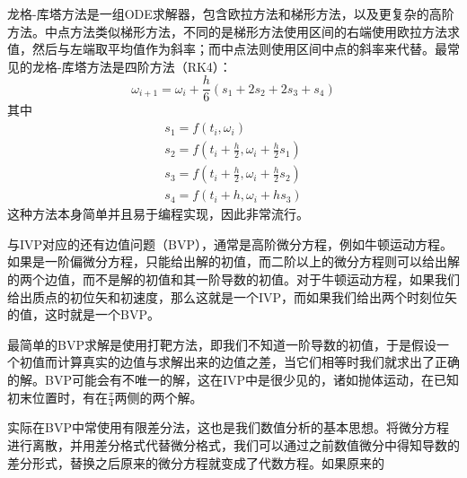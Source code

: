 \documentclass[UTF8,a4paper,10pt]{ctexart}
\begin{document}
\begin{multicols}{2}
            龙格-库塔方法是一组ODE求解器，包含欧拉方法和梯形方法，以及更复杂的高阶方法。中点方法类似梯形方法，不同的是梯形方法使用区间的右端使用欧拉方法求值，然后与左端取平均值作为斜率；而中点法则使用区间中点的斜率来代替。最常见的龙格-库塔方法是四阶方法（RK4）：
            \begin{equation}
                    \omega_{i+1} = \omega_i + \frac{h}{6}(s_1+2s_2+2s_3+s_4)
            \end{equation}
            其中
            \begin{equation*}
                \begin{array}{l}
                    s_1 = f(t_i,\omega_i)\\
                    s_2 = f(t_i+\frac{h}{2},\omega_i+\frac{h}{2}s_1)\\
                    s_3 = f(t_i+\frac{h}{2},\omega_i+\frac{h}{2}s_2)\\
                    s_4 = f(t_i+h,\omega_i+hs_3)
                \end{array}
            \end{equation*}
            这种方法本身简单并且易于编程实现，因此非常流行。\par
            与IVP对应的还有边值问题（BVP），通常是高阶微分方程，例如牛顿运动方程。如果是一阶偏微分方程，只能给出解的初值，而二阶以上的微分方程则可以给出解的两个边值，而不是解的初值和其一阶导数的初值。对于牛顿运动方程，如果我们给出质点的初位矢和初速度，那么这就是一个IVP，而如果我们给出两个时刻位矢的值，这时就是一个BVP。\par
            最简单的BVP求解是使用打靶方法，即我们不知道一阶导数的初值，于是假设一个初值而计算真实的边值与求解出来的边值之差，当它们相等时我们就求出了正确的解。BVP可能会有不唯一的解，这在IVP中是很少见的，诸如抛体运动，在已知初末位置时，有在$\frac{\pi}{4}$两侧的两个解。\par
            实际在BVP中常使用有限差分法，这也是我们数值分析的基本思想。将微分方程进行离散，并用差分格式代替微分格式，我们可以通过之前数值微分中得知导数的差分形式，替换之后原来的微分方程就变成了代数方程。如果原来的

\end{multicols}
\end{document}
